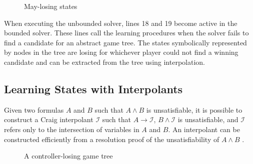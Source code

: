 \documentclass{llncs}
\begin{document}
\begin{figure}
    \centering
    \caption{May-losing states}
    \label{fig:maylosing}
\end{figure}


When executing the unbounded solver, lines 18 and 19 become active in the
bounded solver. These lines call the learning procedures when the solver fails
to find a candidate for an abstract game tree. The states symbolically
represented by nodes in the tree are losing for whichever player could not find
a winning candidate and can be extracted from the tree using interpolation.

\subsection{Learning States with Interpolants}

Given two formulas $A$ and $B$ such that $A \land B$ is unsatisfiable, it is
possible to construct a Craig interpolant\cite{craig1957} $\mathcal{I}$ such
that $A \to \mathcal{I}$, $B \land \mathcal{I}$ is unsatisfiable, and
$\mathcal{I}$ refers only to the intersection of variables in $A$ and $B$.  An
interpolant can be constructed efficiently from a resolution proof of the
unsatisfiability of $A \land B$ \cite{pudlak1997}.

\begin{figure}
    \centering
    \caption{A controller-losing game tree}
    \label{fig:interpolatetree}
\end{figure}
\end{document}
